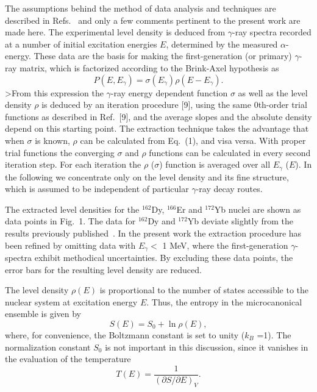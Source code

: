 The assumptions behind the method of data analysis and techniques are
described in Refs.~\cite{8,9} and only a few comments pertinent to the
present work are made here. The experimental level density is deduced from
$\gamma$-ray spectra recorded at a number of initial excitation energies
$E$, determined by the measured $\alpha$-energy. These data are the basis
for making the first-generation (or primary) $\gamma$-ray matrix, which is
factorized according to the Brink-Axel hypothesis \cite{11,12} as
\begin{equation}
P(E,E_{\gamma}) = \sigma (E_{\gamma}) \rho (E -E_{\gamma}).
\end{equation}
>From this expression the $\gamma$-ray energy dependent function $\sigma$ as
well as the level density $\rho$ is deduced by an iteration procedure [9],
using the same 0th-order trial functions as described in Ref.~[9], and the
average slopes and the absolute density depend on this starting point. The
extraction technique takes the advantage that when $\sigma$ is known,
$\rho$ can be calculated from Eq.~(1), and visa versa. With proper trial
functions the converging $\sigma$ and $\rho$ functions can be calculated in
every second iteration step. For each iteration the $\rho$ ($\sigma$)
function is averaged over all $E_{\gamma}$ ($E$). In the following we
concentrate only on the level density and its fine structure, which is
assumed to be independent of particular $\gamma$-ray decay routes.

The extracted level densities for the $^{162}$Dy, $^{166}$Er and $^{172}$Yb
nuclei are shown as data points in Fig.~1. The data for $^{162}$Dy and
$^{172}$Yb deviate slightly from the results previously published~\cite{9}.
In the present work the extraction procedure has been refined by omitting
data with $E_{\gamma} <$ 1 MeV, where the first-generation $\gamma$-spectra
exhibit methodical uncertainties. By excluding these data points, the error
bars for the resulting level density are reduced.

The level density $\rho(E)$ is proportional to the number of states
accessible to the nuclear system at excitation energy $E$. Thus, the
entropy in the microcanonical ensemble is given by \begin{equation}
S(E)=S_0 + \ln \rho(E),
\end{equation}
where, for convenience, the Boltzmann constant is set to unity ($k_B$ =1).
The normalization constant $S_0$ is not important in this discussion, since
it vanishes in the evaluation of the temperature \begin{equation}
T(E)=\frac{1}{(\partial S/\partial E)_V}. \end{equation}

